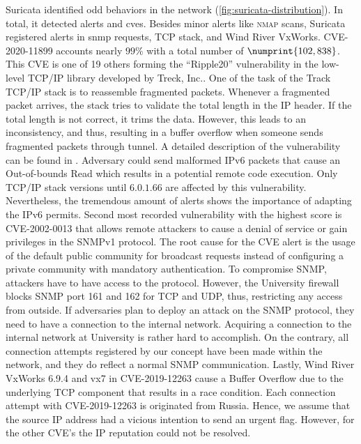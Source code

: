 Suricata identified odd behaviors in the network (\autoref{fig:suricata-distribution}).
In total, it detected  alerts and \acsp{cve}.
Besides minor alerts like \textsc{nmap} scans, Suricata registered alerts in \ac{snmp} requests, TCP stack, and Wind River VxWorks.
CVE-2020-11899 \cite{CVE-2020-11899} accounts nearly $99\%$ with a total number of $\numprint{102,838}$.
This CVE is one of 19 others forming the \enquote{Ripple20} vulnerability in the low-level TCP/IP library developed by Treck, Inc..
One of the task of the Track TCP/IP stack is to reassemble fragmented packets.
Whenever a fragmented packet arrives, the stack tries to validate the total length in the IP header.
If the total length is not correct, it trims the data.
However, this leads to an inconsistency, and thus, resulting in a buffer overflow when someone sends fragmented packets through tunnel.
A detailed description of the vulnerability can be found in \cite{ripple20}.
Adversary could send malformed IPv6 packets that cause an Out-of-bounds Read which results in a potential remote code execution.
Only TCP/IP stack versions until $6.0.1.66$ are affected by this vulnerability.
Nevertheless, the tremendous amount of alerts shows the importance of adapting the IPv6 permits.
Second most recorded vulnerability with the highest score is CVE-2002-0013 \cite{CVE-2002-0013} that allows remote attackers to cause a denial of service or gain privileges in the SNMPv1 protocol.
The root cause for the CVE alert is the usage of the default public community for broadcast requests instead of configuring a private community with mandatory authentication.
To compromise SNMP, attackers have to have access to the protocol.
However, the University firewall blocks SNMP port 161 and 162 for TCP and UDP, thus, restricting any access from outside.
If adversaries plan to deploy an attack on the SNMP protocol, they need to have a connection to the internal network.
Acquiring a connection to the internal network at University is rather hard to accomplish.
On the contrary, all connection attempts registered by our concept have been made within the network, and they do reflect a normal SNMP communication.
Lastly, Wind River VxWorks 6.9.4 and vx7 in CVE-2019-12263 \cite{CVE-2019-12263} cause a Buffer Overflow due to the underlying TCP component that results in a race condition.
Each connection attempt with CVE-2019-12263 is originated from Russia.
Hence, we assume that the source IP address had a vicious intention to send an urgent flag.
However, for the other CVE's the IP reputation could not be resolved.

